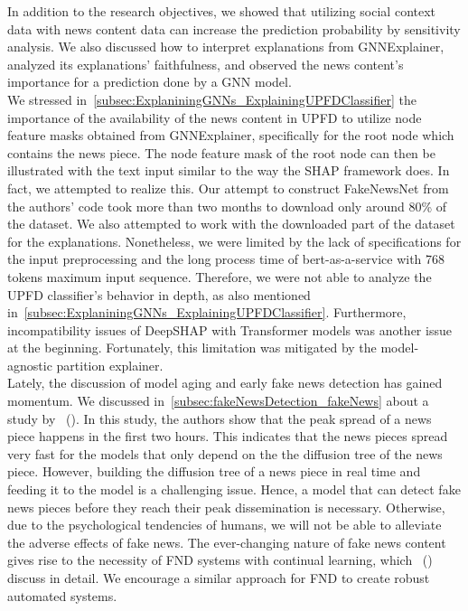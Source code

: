 In addition to the research objectives, we showed that utilizing social context data with news content data can increase the prediction probability by sensitivity analysis. We also discussed how to interpret explanations from GNNExplainer, analyzed its explanations' faithfulness, and observed the news content's importance for a prediction done by a GNN model.\\
We stressed in~\ref{subsec:ExplaniningGNNs_ExplainingUPFDClassifier} the importance of the availability of the news content in UPFD to utilize node feature masks obtained from GNNExplainer, specifically for the root node which contains the news piece. The node feature mask of the root node can then be illustrated with the text input similar to the way the SHAP framework does. In fact, we attempted to realize this. Our attempt to construct FakeNewsNet from the authors' code took more than two months to download only around 80\% of the dataset. We also attempted to work with the downloaded part of the dataset for the explanations. Nonetheless, we were limited by the lack of specifications for the input preprocessing and the long process time of bert-as-a-service with 768 tokens maximum input sequence. Therefore, we were not able to analyze the UPFD classifier's behavior in depth, as also mentioned in~\ref{subsec:ExplaniningGNNs_ExplainingUPFDClassifier}. Furthermore, incompatibility issues of DeepSHAP with Transformer models was another issue at the beginning. Fortunately, this limitation was mitigated by the model-agnostic partition explainer.\\
Lately, the discussion of model aging and early fake news detection has gained momentum. We discussed in~\ref{subsec:fakeNewsDetection_fakeNews} about a study by~\citeauthor{FakeNewsDetectionUsingGeometricDeepLearning_Monti} (\citeyear{FakeNewsDetectionUsingGeometricDeepLearning_Monti}). In this study, the authors show that the peak spread of a news piece happens in the first two hours. This indicates that the news pieces spread very fast for the models that only depend on the the diffusion tree of the news piece. However, building the diffusion tree of a news piece in real time and feeding it to the model is a challenging issue. Hence, a model that can detect fake news pieces before they reach their peak dissemination is necessary. Otherwise, due to the psychological tendencies of humans, we will not be able to alleviate the adverse effects of fake news. The ever-changing nature of fake news content gives rise to the necessity of FND systems with continual learning, which~\citeauthor{GraphNeuralNetworksWithContinualLearningFakeNewsDetection_Han} (\citeyear{GraphNeuralNetworksWithContinualLearningFakeNewsDetection_Han}) discuss in detail. We encourage a similar approach for FND to create robust automated systems.\\
